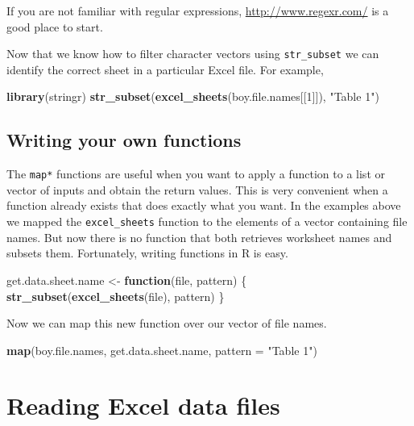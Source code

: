 \documentclass[]{book}
\newenvironment{Shaded}{\begin{snugshade}}{\end{snugshade}}
\newcommand{\KeywordTok}[1]{\textcolor[rgb]{0.13,0.29,0.53}{\textbf{#1}}}
\newcommand{\DataTypeTok}[1]{\textcolor[rgb]{0.13,0.29,0.53}{#1}}
\newcommand{\DecValTok}[1]{\textcolor[rgb]{0.00,0.00,0.81}{#1}}
\newcommand{\StringTok}[1]{\textcolor[rgb]{0.31,0.60,0.02}{#1}}
\newcommand{\ControlFlowTok}[1]{\textcolor[rgb]{0.13,0.29,0.53}{\textbf{#1}}}
\newcommand{\NormalTok}[1]{#1}
\begin{document}
If you are not familiar with regular expressions,
\url{http://www.regexr.com/} is a good place to start.

Now that we know how to filter character vectors using
\texttt{str\_subset} we can identify the correct sheet in a particular
Excel file. For example,

\begin{Shaded}
\begin{Highlighting}[]
\KeywordTok{library}\NormalTok{(stringr)}
\KeywordTok{str_subset}\NormalTok{(}\KeywordTok{excel_sheets}\NormalTok{(boy.file.names[[}\DecValTok{1}\NormalTok{]]), }\StringTok{"Table 1"}\NormalTok{)}
\end{Highlighting}
\end{Shaded}

\subsection{Writing your own
functions}\label{writing-your-own-functions}

The \texttt{map*} functions are useful when you want to apply a function
to a list or vector of inputs and obtain the return values. This is very
convenient when a function already exists that does exactly what you
want. In the examples above we mapped the \texttt{excel\_sheets}
function to the elements of a vector containing file names. But now
there is no function that both retrieves worksheet names and subsets
them. Fortunately, writing functions in R is easy.

\begin{Shaded}
\begin{Highlighting}[]
\NormalTok{get.data.sheet.name <-}\StringTok{ }\ControlFlowTok{function}\NormalTok{(file, pattern) \{}
    \KeywordTok{str_subset}\NormalTok{(}\KeywordTok{excel_sheets}\NormalTok{(file), pattern)}
\NormalTok{\}}
\end{Highlighting}
\end{Shaded}

Now we can map this new function over our vector of file names.

\begin{Shaded}
\begin{Highlighting}[]
\KeywordTok{map}\NormalTok{(boy.file.names,}
\NormalTok{    get.data.sheet.name,}
    \DataTypeTok{pattern =} \StringTok{"Table 1"}\NormalTok{)}
\end{Highlighting}
\end{Shaded}

\section{Reading Excel data files}\label{reading-excel-data-files}
\end{document}
